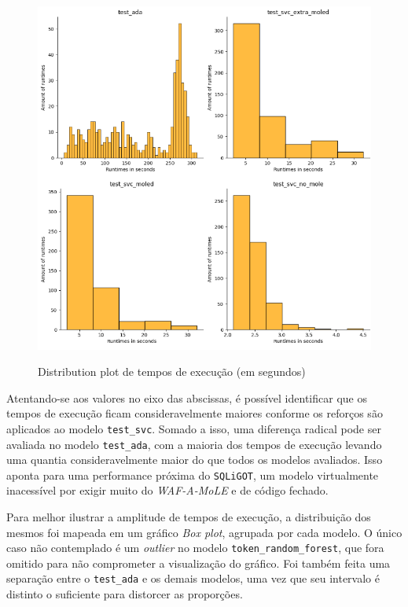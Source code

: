 \begin{figure}[ht]
    \centering
    \caption{Distribution plot de tempos de execução (em segundos)}
    \includegraphics[width=18cm]{figuras/graficos/runtimes_amount_set1.png} 
    \label{fig:mole-evolution} 
\end{figure}

Atentando-se aos valores no eixo das abscissas, é possível identificar que os tempos de execução ficam consideravelmente maiores conforme os reforços são aplicados ao modelo \verb+test_svc+. Somado a isso, uma diferença radical pode ser avaliada no modelo \verb+test_ada+, com a maioria dos tempos de execução levando uma quantia consideravelmente maior do que todos os modelos avaliados. Isso aponta para uma performance próxima do \verb+SQLiGOT+, um modelo virtualmente inacessível por exigir muito do \textit{WAF-A-MoLE} e de código fechado.

Para melhor ilustrar a amplitude de tempos de execução, a distribuição dos mesmos foi mapeada em um gráfico \textit{Box plot}, agrupada por cada modelo. O único caso não contemplado é um \textit{outlier} no modelo \verb+token_random_forest+, que fora omitido para não comprometer a visualização do gráfico. Foi também feita uma separação entre o \verb+test_ada+ e os demais modelos, uma vez que seu intervalo é distinto o suficiente para distorcer as proporções.

